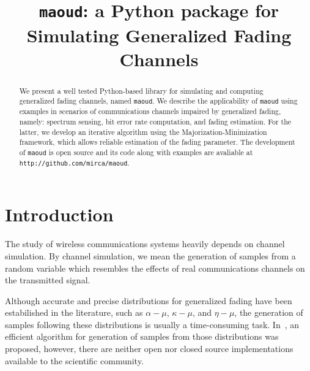 \documentclass[conference, 10pt]{IEEEtran}
\begin{document}
\title{\texttt{maoud}: a Python package for Simulating Generalized Fading Channels}

\author{
}

\maketitle

\begin{abstract}
    We present a well tested Python-based library for simulating and computing
    generalized fading channels, named \texttt{maoud}. We describe the
    applicability of \texttt{maoud} using examples in scenarios of communications
    channels impaired by generalized fading, namely: spectrum sensing, bit error
    rate computation, and fading estimation. For the latter, we develop an iterative
    algorithm using the Majorization-Minimization framework, which allows reliable
    estimation of the fading parameter. The development of \texttt{maoud} is open
    source and its code along with examples are avaliable at
    \texttt{http://github.com/mirca/maoud}.
\end{abstract}

\IEEEpeerreviewmaketitle
\section{Introduction}

The study of wireless communications systems heavily depends on channel simulation.
By channel simulation, we mean the generation of samples from a random variable
which resembles the effects of real communications channels on the transmitted signal.

Although accurate and precise distributions for generalized fading have been
estabilished in the literature, such as $\alpha-\mu$, $\kappa-\mu$, and
$\eta-\mu$, the generation of samples following these distributions is usually
a time-consuming task. In~\cite{}, an efficient algorithm for generation of samples
from those distributions was proposed, however, there are neither open nor
closed source implementations available to the scientific community.
\end{document}
